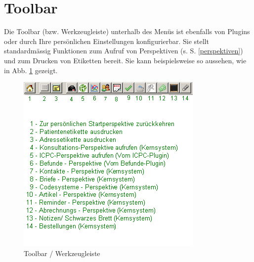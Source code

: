 \section{Toolbar}
Die Toolbar (bzw. Werkzeugleiste) unterhalb des Menüs ist ebenfalls von Plugins
oder durch Ihre persönlichen Einstellungen konfigurierbar. Sie stellt
standardmässig Funktionen zum Aufruf von Perspektiven (s. S. \ref{perspektiven})
und zum Drucken von Etiketten bereit. Sie kann beispielsweise so aussehen, wie
in Abb. \ref{fig:toolbar} gezeigt.
\begin{figure}[htp]
\begin{center}
  \includegraphics{images/toolbar}
  \caption{Toolbar / Werkzeugleiste}
  \label{fig:toolbar}
\end{center}
\end{figure}
